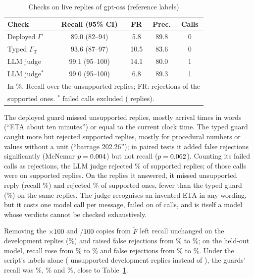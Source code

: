 \documentclass[conference]{IEEEtran}
\begin{document}
\begin{table}[t]
\caption{Checks on \LiveN{} live replies of gpt-oss (reference labels)}
\label{tab:live}
\centering
\footnotesize
\setlength{\tabcolsep}{3pt}
\begin{tabular}{lcccc}
\toprule
Check & Recall (95\% CI) & FR & Prec. & Calls\\
\midrule
Deployed $\Gamma$ & 89.0 (82--94) & 5.8 & 89.8 & 0\\
Typed $\Gamma_{\mathrm{T}}$ & 93.6 (87--97) & 10.5 & 83.6 & 0\\
LLM judge & 99.1 (95--100) & 14.1 & 80.0 & 1\\
LLM judge$^\ast$ &99.0 (95--100) & 6.8 & 89.3 & 1\\
\bottomrule
\multicolumn{5}{l}{\scriptsize In \%. Recall over the \LiveUnsup{} unsupported replies; FR: rejections of the}\\
\multicolumn{5}{l}{\scriptsize \LiveSup{} supported ones. $^\ast$\JudFailN{} failed calls excluded (\JudAnsN{} replies).}\\
\end{tabular}
\end{table}

The deployed guard missed \LiveDepMiss{} unsupported replies, mostly arrival times in words (``ETA about ten minutes'') or equal to the current clock time. The typed guard caught more but rejected \LiveTypFpN{} supported replies, mostly for procedural numbers or values without a unit (``barrage 202.26''); in paired tests it added false rejections significantly (McNemar $p=0.004$) but not recall ($p=0.062$). Counting its \JudFailN{} failed calls as rejections, the LLM judge rejected \LiveJJudFpr\% of supported replies; \JudFailSup{} of those calls were on supported replies. On the \JudAnsN{} replies it answered, it missed \JudAnsMiss{} unsupported reply (recall \JudAnsRec\%) and rejected \JudAnsFpr\% of supported ones, fewer than the typed guard (\JudAnsTypFpr\%) on the same replies. The judge recognises an invented ETA in any wording, but it costs one model call per message, failed on \JudFailN{} of \LiveN{} calls, and is itself a model whose verdicts cannot be checked exhaustively.

Removing the $\times100$ and $/100$ copies from $\tilde F$ left recall unchanged on the development replies (\NsDevRec\%) and raised false rejections from \LiveDepFpr\% to \NsDevFpr\%; on the held-out model, recall rose from \HoDepRec\% to \NsHoRec\% and false rejections from \HoDepFpr\% to \NsHoFpr\%. Under the script's labels alone (\PoDevUnsup{} unsupported development replies instead of \LiveUnsup), the guards' recall was \PoDevDepRec\%, \PoDevTypRec\% and \PoDevVtwoRec\%, close to Table~\ref{tab:live}.
\end{document}
